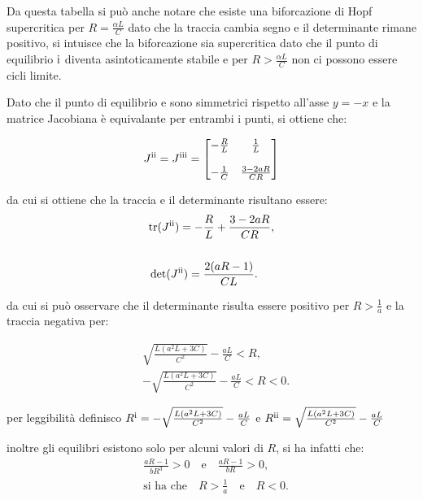\documentclass{article}
\newcommand{\rom}[1]{\uppercase\expandafter{\romannumeral #1\relax}}
\begin{document}
Da questa tabella si può anche notare che esiste una biforcazione di Hopf supercritica per \(R = \frac{\alpha L}{C}\) dato che la traccia cambia segno e il determinante rimane positivo, si intuisce che la biforcazione sia supercritica dato che il punto di equilibrio \(\text{\rom{1}}\) diventa asintoticamente stabile e per \(R > \frac{\alpha L}{C}\) non ci possono essere cicli limite.

Dato che il punto di equilibrio \rom{2} e \rom{3} sono simmetrici rispetto all'asse \(y = -x\) e la matrice Jacobiana è equivalante per entrambi i punti, si ottiene che:

\[
    J^\text{\rom{2}} = J^\text{\rom{3}} =
    \begin{bmatrix}
        -\frac{R}{L} & \frac{1}{L}        \\\\
        -\frac{1}{C} & \frac{3 - 2aR}{CR}
    \end{bmatrix}
\]

da cui si ottiene che la traccia e il determinante risultano essere:
\begin{align*}
     & \text{tr}(J^\text{\rom{2}}) = -\frac{R}{L} + \frac{3 - 2aR}{C R}, \\\\
     & \det(J^\text{\rom{2}})      = \frac{2(aR - 1)}{CL}.
\end{align*}

da cui si può osservare che il determinante risulta essere positivo per \(R > \frac{1}{a}\) e la traccia negativa per:

\begin{align*}
     & \sqrt{\frac{L(a^2L + 3C)}{C^2}} - \frac{aL}{C} < R,       \\
     & - \sqrt{\frac{L(a^2L + 3C)}{C^2}} - \frac{aL}{C} < R < 0.
\end{align*}

per leggibilità definisco \(R^\text{\rom{1}} = - \sqrt{\frac{L(a^2L + 3C)}{C^2}} - \frac{aL}{C}\) e \(R^\text{\rom{2}} = \sqrt{\frac{L(a^2L + 3C)}{C^2}} - \frac{aL}{C}\)

inoltre gli equilibri esistono solo per alcuni valori di \(R\), si ha infatti che:
\begin{align*}
     & \frac{a R - 1}{b R^3} > 0 \hspace{1em} \text{e} \hspace{1em} \frac{a R - 1}{b R} > 0,   \\
     & \text{si ha che} \hspace{1em} R > \frac{1}{a} \hspace{1em} \text{e} \hspace{1em} R < 0.
\end{align*}
\end{document}
